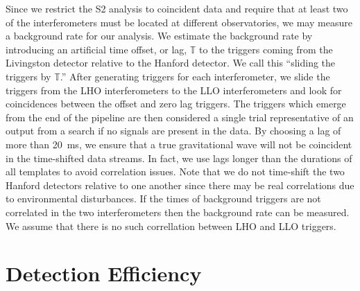 Since we restrict the S2 analysis to coincident data and require that at least
two of the interferometers must be located at different observatories, we may
measure a background rate for our analysis.  We estimate the background rate
by introducing an artificial time offset, or {lag}, $\mathbb{T}$ to the
triggers coming from the Livingston detector relative to the Hanford detector.
We call this ``sliding the triggers by $\mathbb{T}$.'' After generating
triggers for each interferometer, we slide the triggers from the LHO
interferometers to the LLO interferometers and look for coincidences between
the offset and zero lag triggers.  The triggers which emerge from the end of
the pipeline are then considered a single trial representative of an output
from a search if no signals are present in the data.   By choosing a lag of
more than 20~ms, we ensure that a true gravitational wave will not be
coincident in the time-shifted data streams.  In fact, we use lags longer than
the durations of all templates to avoid correlation issues.  Note that we do
not time-shift the two Hanford detectors relative to one another since there
may be real correlations due to environmental disturbances.  If the times of
background triggers are not correlated in the two interferometers then the
background rate can be measured. We assume that there is no such correllation
between LHO and LLO triggers.

\section{Detection Efficiency}
\label{s:eff}

